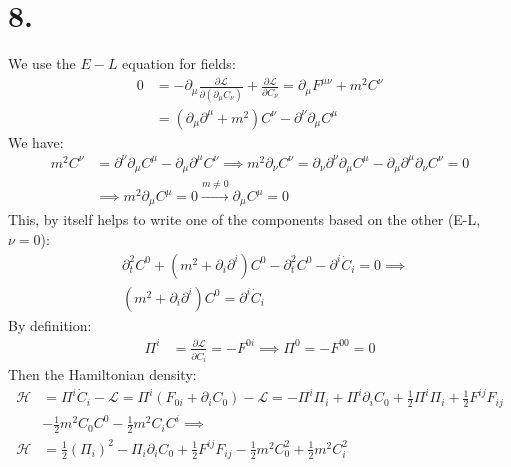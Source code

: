 \documentclass{article}
\newcommand{\pd}{\partial}  %
\newcommand{\pdm}{\partial_\mu}  %
\newcommand{\pdn}{\partial_\nu}  %
\newcommand{\pdup}{\partial^\mu}  %
\newcommand{\pdupnu}{\partial^\nu}  %
\newcommand{\Lag}{\mathcal{L}}  %
\newcommand{\onehalf}{\frac{1}{2}}
\begin{document}
\section*{8.}
We use the $E-L$ equation for fields:
\begin{equation}
    \begin{split}
        0 &= -\pdm \frac{\pd\Lag}{\pd(\pdm C_\nu)} + \frac{\pd\Lag}{\pd C_\nu} = \pdm F^{\mu\nu} + m^2C^\nu \\
        & = (\pdm\pdup + m^2)C^\nu - \pdupnu \pdm C^\mu   
    \end{split}
\end{equation}
We have:
\begin{equation}
    \begin{split}
        m^2C^\nu &= \pdupnu \pdm C^\mu - \pdm\pdup C^\nu \implies m^2 \pdn C^\nu = \pdn\pdupnu\pdm C^\mu - 
        \pdm\pdup\pdn C^\nu = 0 \\
        & \implies m^2 \pdm C^\mu = 0 \xrightarrow{m \ne 0} \pdm C^\mu = 0
    \end{split}
\end{equation}
This, by itself helps to write one of the components based on the other (E-L, $\nu = 0$):
\begin{equation}
    \begin{split}
       & \pd_t^2 C^0 + (m^2 + \pd_i\pd^i)C^0 - \pd_t^2 C^0 - \pd^i \dot{C}_i = 0 \implies \\
       & (m^2 + \pd_i\pd^i)C^0 =  \pd^i \dot{C}_i
    \end{split}
\end{equation}
By definition:
\begin{equation}
    \begin{split}
        \Pi^i &= \frac{\pd \Lag}{\pd \dot{C}_i} = -F^{0i} \implies \Pi^0 = -F^{00} = 0 
    \end{split}
\end{equation}
Then the Hamiltonian density:
\begin{equation}
    \begin{split}
        \mathcal{H} & = \Pi^i \dot{C}_i - \Lag = \Pi^i(F_{0i}+\pd_iC_0)-\Lag = -\Pi^i\Pi_i + \Pi^i\pd_iC_0 + \onehalf \Pi^i\Pi_i + \onehalf F^{ij}F_{ij}\\
        &-\onehalf m^2 C_0C^0 - \onehalf m^2 C_iC^i \implies \\
        \mathcal{H} & = \onehalf(\Pi_i)^2 - \Pi_i\pd_iC_0 + \onehalf F^{ij}F_{ij} - \onehalf m^2 C_0^2 + \onehalf m^2 C_i^2
    \end{split}
\end{equation}
\end{document}
